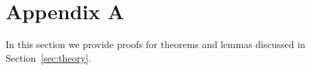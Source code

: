 \section*{Appendix A}
In this section we provide proofs for theorems and lemmas discussed in Section~\ref{sec:theory}.\\\\
\allowdisplaybreaks


